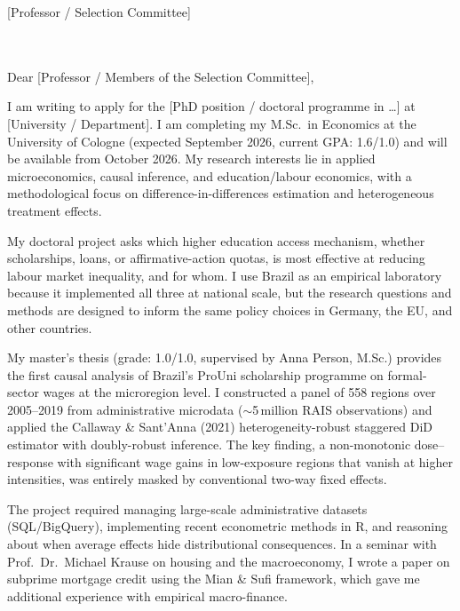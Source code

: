 \documentclass[a4paper,11pt]{letter}
\begin{document}
\begin{letter}{%
    [Professor / Selection Committee] \\
    [Department of Economics] \\
    [University] \\
    [Address]
}

\opening{Dear [Professor / Members of the Selection Committee],}

I am writing to apply for the [PhD position / doctoral programme in \ldots] at [University / Department]. I am completing my M.Sc.\ in Economics at the University of Cologne (expected September 2026, current GPA: 1.6/1.0) and will be available from October 2026. My research interests lie in applied microeconomics, causal inference, and education/labour economics, with a methodological focus on difference-in-differences estimation and heterogeneous treatment effects.


My doctoral project asks which higher education access mechanism, whether scholarships, loans, or affirmative-action quotas, is most effective at reducing labour market inequality, and for whom. I use Brazil as an empirical laboratory because it implemented all three at national scale, but the research questions and methods are designed to inform the same policy choices in Germany, the EU, and other countries.

My master's thesis (grade: 1.0/1.0, supervised by Anna Person, M.Sc.) provides the first causal analysis of Brazil's ProUni scholarship programme on formal-sector wages at the microregion level. I constructed a panel of 558 regions over 2005--2019 from administrative microdata ($\sim$5\,million RAIS observations) and applied the Callaway \& Sant'Anna (2021) heterogeneity-robust staggered DiD estimator with doubly-robust inference. The key finding, a non-monotonic dose--response with significant wage gains in low-exposure regions that vanish at higher intensities, was entirely masked by conventional two-way fixed effects.

The project required managing large-scale administrative datasets (SQL/BigQuery), implementing recent econometric methods in R, and reasoning about when average effects hide distributional consequences. In a seminar with Prof.\ Dr.\ Michael Krause on housing and the macroeconomy, I wrote a paper on subprime mortgage credit using the Mian \& Sufi framework, which gave me additional experience with empirical macro-finance.


\end{letter}
\end{document}
